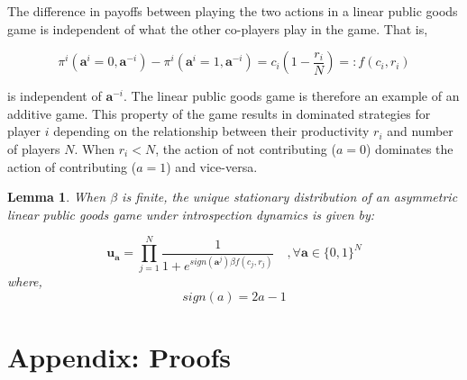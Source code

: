 \documentclass[11pt]{article}
\theoremstyle{plainCl1}
\theoremstyle{plainCl2}
\newtheorem{lemma}{Lemma}
\newcommand{\abf}{\mathbf{a}}
\newcommand{\ubf}{\mathbf{u}}
\begin{document}
\noindent The difference in payoffs between playing the two actions in a linear public goods game is independent of what the other co-players play in the game. That is, 

\begin{equation}
\pi^i(\abf^i = 0, \abf^{-i}) - \pi^i(\abf^i = 1, \abf^{-i}) = c_i \left(1 - \frac{r_i}{N} \right) =: f(c_i, r_i) 
\label{Eq:difference-payoffs-lpgg}
\end{equation}

\noindent is independent of $\abf^{-i}$. The linear public goods game is therefore an example of an additive game. This property of the game results in dominated strategies for player $i$ depending on the relationship between their productivity $r_i$ and number of players $N$. When $r_i < N$, the action of not contributing ($a = 0$) dominates the action of contributing ($a = 1$) and vice-versa. 

\begin{lemma}
\label{prop:stationary-dist-lpgg}
When $\beta$ is finite, the unique stationary distribution of an asymmetric linear public goods game under introspection dynamics is given by: 

\begin{equation}
\ubf_\abf = \prod_{j = 1}^{N} \frac{1}{1 + \displaystyle e^{\mathit{sign}(\abf^j)\beta f(c_j, r_j )}} \quad ,\forall \abf \in \{0,1\}^N
\label{Eq:stationary_dist_lpgg}
\end{equation}
where, 
\begin{equation}
\mathit{sign}(a) = 2a - 1
\end{equation}
\end{lemma}

\section*{Appendix: Proofs}
\end{document}
